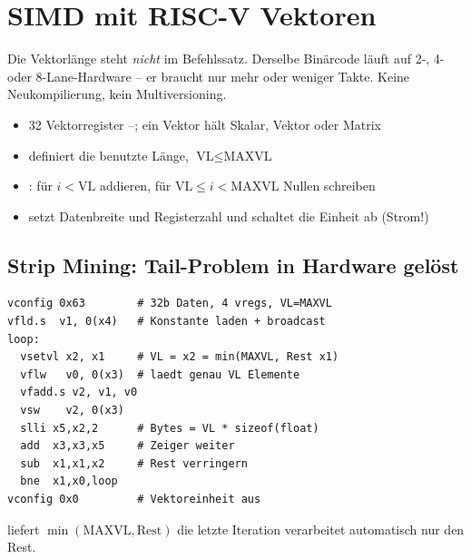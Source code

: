 \section{SIMD mit RISC-V Vektoren}
\label{sec:rvv}

\begin{formel}
Die Vektorlänge steht \emph{nicht} im Befehlssatz. Derselbe Binärcode
läuft auf 2-, 4- oder 8-Lane-Hardware -- er braucht nur mehr oder weniger
Takte. Keine Neukompilierung, kein Multiversioning.
\end{formel}

\begin{itemize}
\item 32 Vektorregister --; ein Vektor hält Skalar, Vektor
      oder Matrix
\item {} definiert die benutzte Länge, $\text{VL}\le\text{MAXVL}$
\item {}: für $i<\text{VL}$ addieren,
      für $\text{VL}\le i<\text{MAXVL}$ Nullen schreiben
\item {} setzt Datenbreite und Registerzahl und schaltet die
      Einheit ab (Strom!)
\end{itemize}

\subsection{Strip Mining: Tail-Problem in Hardware gelöst}
\begin{lstlisting}
vconfig 0x63        # 32b Daten, 4 vregs, VL=MAXVL
vfld.s  v1, 0(x4)   # Konstante laden + broadcast
loop:
  vsetvl x2, x1     # VL = x2 = min(MAXVL, Rest x1)
  vflw   v0, 0(x3)  # laedt genau VL Elemente
  vfadd.s v2, v1, v0
  vsw    v2, 0(x3)
  slli x5,x2,2      # Bytes = VL * sizeof(float)
  add  x3,x3,x5     # Zeiger weiter
  sub  x1,x1,x2     # Rest verringern
  bne  x1,x0,loop
vconfig 0x0         # Vektoreinheit aus
\end{lstlisting}
 liefert $\min(\text{MAXVL},\text{Rest})$ \ra die letzte
Iteration verarbeitet automatisch nur den Rest. 

